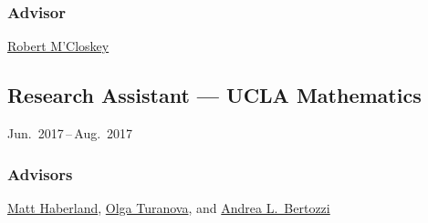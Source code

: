 \documentclass[11pt]{article}
\newcommand{\subsectionskip}{\baselineskip}	%
\newcommand{\cvdates}[2]{\hfill#1\,--\,#2}	%
\begin{document}
	\subsubsection{Advisor}
	\href{http://www.seas.ucla.edu/mcloskey/}{Robert M'Closkey}
	
	\vspace*{\subsectionskip}
	
	\subsection{Research Assistant --- UCLA Mathematics}
	\cvdates{Jun.\ 2017}{Aug.\ 2017}
	
	\subsubsection{Advisors}
	\href{https://brae.calpoly.edu/faculty-and-staff-haberland}{Matt Haberland}, \href{https://sites.google.com/msu.edu/turanova/home}{Olga Turanova}, and \href{http://www.math.ucla.edu/~bertozzi/}{Andrea L.\ Bertozzi}

\end{document}
